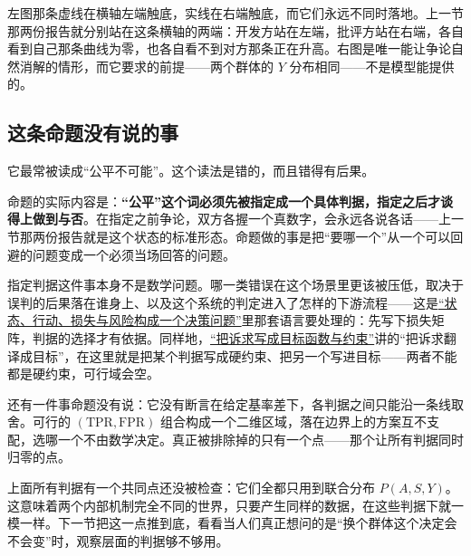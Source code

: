 左图那条虚线在横轴左端触底，实线在右端触底，而它们永远不同时落地。上一节那两份报告就分别站在这条横轴的两端：开发方站在左端，批评方站在右端，各自看到自己那条曲线为零，也各自看不到对方那条正在升高。右图是唯一能让争论自然消解的情形，而它要求的前提——两个群体的 \(Y\) 分布相同——不是模型能提供的。

\subsection{这条命题没有说的事}

它最常被读成``公平不可能''。这个读法是错的，而且错得有后果。

命题的实际内容是：\textbf{``公平''这个词必须先被指定成一个具体判据，指定之后才谈得上做到与否}。在指定之前争论，双方各握一个真数字，会永远各说各话——上一节那两份报告就是这个状态的标准形态。命题做的事是把``要哪一个''从一个可以回避的问题变成一个必须当场回答的问题。

指定判据这件事本身不是数学问题。哪一类错误在这个场景里更该被压低，取决于误判的后果落在谁身上、以及这个系统的判定进入了怎样的下游流程——这是\hyperref[sec:11-Mathematical-Statistics/07-Statistical-Decision-and-Reliable-Prediction/01]{``状态、行动、损失与风险构成一个决策问题''}里那套语言要处理的：先写下损失矩阵，判据的选择才有依据。同样地，\hyperref[sec:18-Synthesis/01-System-Lifecycle/01]{``把诉求写成目标函数与约束''}讲的``把诉求翻译成目标''，在这里就是把某个判据写成硬约束、把另一个写进目标——两者不能都是硬约束，可行域会空。

还有一件事命题没有说：它没有断言在给定基率差下，各判据之间只能沿一条线取舍。可行的 \((\mathrm{TPR},\mathrm{FPR})\) 组合构成一个二维区域，落在边界上的方案互不支配，选哪一个不由数学决定。真正被排除掉的只有一个点——那个让所有判据同时归零的点。

上面所有判据有一个共同点还没被检查：它们全都只用到联合分布 \(P(A,S,Y)\)。这意味着两个内部机制完全不同的世界，只要产生同样的数据，在这些判据下就一模一样。下一节把这一点推到底，看看当人们真正想问的是``换个群体这个决定会不会变''时，观察层面的判据够不够用。

